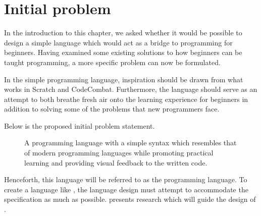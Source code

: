 \section{Initial problem}\label{sec:initial_problem}
In the introduction to this chapter, we asked whether it would be possible to design a simple language which would act as a bridge to programming for beginners.
Having examined some existing solutions to how beginners can be taught programming, a more specific problem can now be formulated.

In the simple programming language, inspiration should be drawn from what works in Scratch and CodeCombat. Furthermore, the language should serve as an attempt to both breathe fresh air onto the learning experience for beginners in addition to solving some of the problems that new programmers face.

Below is the proposed initial problem statement.

\begin{figure}[h]
    \vspace{0.5cm}
    \centering
    \begin{framed}
        A programming language with a simple syntax which resembles that of modern programming languages while promoting practical learning and providing visual feedback to the written code.
    \end{framed}
    \vspace{-0.5cm}
    \label{fig:dazel_specification}
    \vspace{0.5cm}
\end{figure}

Henceforth, this language will be referred to as the \dazel{} programming language.
To create a language like \dazel{}, the language design must attempt to accommodate the specification as much as possible.  presents research which will guide the design of \dazel{}.